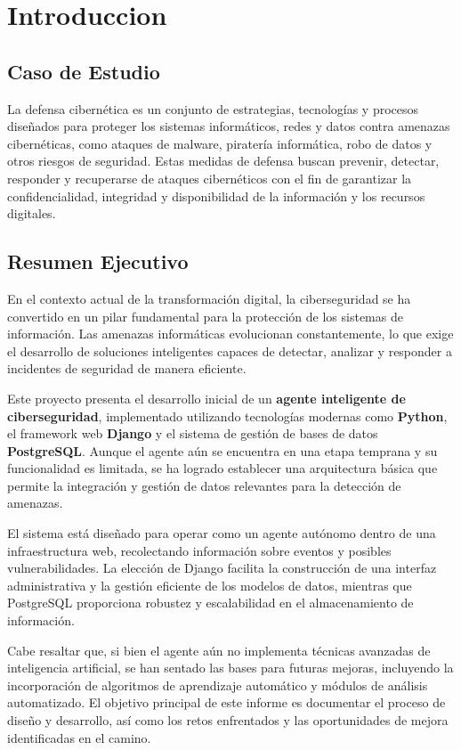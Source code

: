\section{Introduccion}

\subsection{Caso de Estudio}
La defensa cibernética es un conjunto de estrategias, tecnologías y procesos
diseñados para proteger los sistemas informáticos, redes y datos contra
amenazas cibernéticas, como ataques de malware, piratería informática, robo de
datos y otros riesgos de seguridad. Estas medidas de defensa buscan prevenir,
detectar, responder y recuperarse de ataques cibernéticos con el fin de
garantizar la confidencialidad, integridad y disponibilidad de la información y
los recursos digitales.

\subsection{Resumen Ejecutivo}

En el contexto actual de la transformación digital, la ciberseguridad se ha convertido en un pilar fundamental para la protección de los sistemas de información. Las amenazas informáticas evolucionan constantemente, lo que exige el desarrollo de soluciones inteligentes capaces de detectar, analizar y responder a incidentes de seguridad de manera eficiente.

Este proyecto presenta el desarrollo inicial de un \textbf{agente inteligente de ciberseguridad}, implementado utilizando tecnologías modernas como \textbf{Python}, el framework web \textbf{Django} y el sistema de gestión de bases de datos \textbf{PostgreSQL}. Aunque el agente aún se encuentra en una etapa temprana y su funcionalidad es limitada, se ha logrado establecer una arquitectura básica que permite la integración y gestión de datos relevantes para la detección de amenazas.

El sistema está diseñado para operar como un agente autónomo dentro de una infraestructura web, recolectando información sobre eventos y posibles vulnerabilidades. La elección de Django facilita la construcción de una interfaz administrativa y la gestión eficiente de los modelos de datos, mientras que PostgreSQL proporciona robustez y escalabilidad en el almacenamiento de información.

Cabe resaltar que, si bien el agente aún no implementa técnicas avanzadas de inteligencia artificial, se han sentado las bases para futuras mejoras, incluyendo la incorporación de algoritmos de aprendizaje automático y módulos de análisis automatizado. El objetivo principal de este informe es documentar el proceso de diseño y desarrollo, así como los retos enfrentados y las oportunidades de mejora identificadas en el camino.
